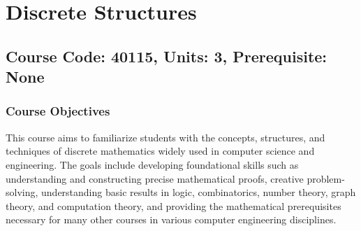 \documentclass[12pt]{article}
\begin{document}
\newpage

\section{Discrete Structures}
\subsection*{Course Code: 40115, Units: 3, Prerequisite: None}

\subsubsection*{Course Objectives}
This course aims to familiarize students with the concepts, structures, and techniques of discrete mathematics widely used in computer science and engineering. The goals include developing foundational skills such as understanding and constructing precise mathematical proofs, creative problem-solving, understanding basic results in logic, combinatorics, number theory, graph theory, and computation theory, and providing the mathematical prerequisites necessary for many other courses in various computer engineering disciplines.
\end{document}
